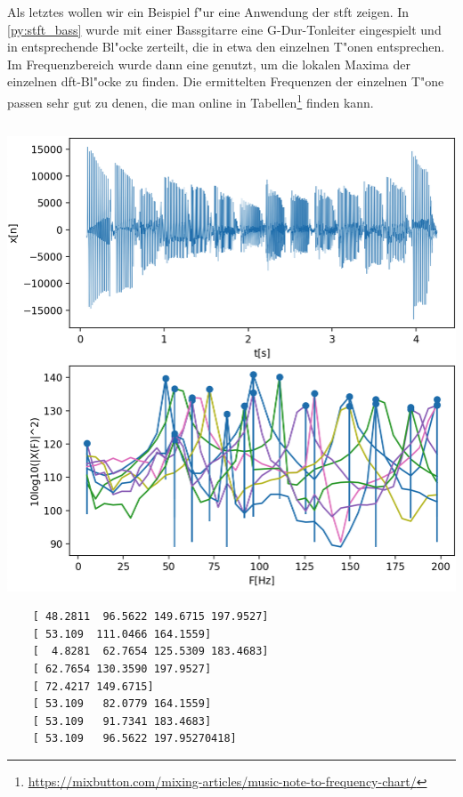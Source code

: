 Als letztes wollen wir ein Beispiel f"ur eine Anwendung der \gls{stft} zeigen. 
In \cref{py:stft_bass} wurde mit einer Bassgitarre eine G-Dur-Tonleiter eingespielt und in entsprechende Bl"ocke zerteilt, die in etwa den einzelnen T"onen entsprechen.
Im Frequenzbereich wurde dann eine  genutzt, um die lokalen Maxima der einzelnen \gls{dft}-Bl"ocke zu finden.
Die ermittelten Frequenzen der einzelnen T"one passen sehr gut zu denen, die man online in Tabellen\footnote{\url{https://mixbutton.com/mixing-articles/music-note-to-frequency-chart/}} finden kann.
\begin{listing}[ht]
    \noindent
    \begin{minipage}{0.51\textwidth}
        \strut\vspace*{-\baselineskip}\newline
        \inputminted[firstline=10, lastline=44]{python3}{code/stft_bass.py}
    \end{minipage}%
    \begin{minipage}{0.48\textwidth}
        \strut\vspace*{-\baselineskip}\newline
        \includegraphics[width=\textwidth]{code/stft_bass.png}\\
    \begin{verbatim}
    [ 48.2811  96.5622 149.6715 197.9527]
    [ 53.109  111.0466 164.1559]
    [  4.8281  62.7654 125.5309 183.4683]
    [ 62.7654 130.3590 197.9527]
    [ 72.4217 149.6715]
    [ 53.109   82.0779 164.1559]
    [ 53.109   91.7341 183.4683]
    [ 53.109   96.5622 197.95270418]
    \end{verbatim}
    \end{minipage}
    \label{py:stft_bass}
\end{listing}

